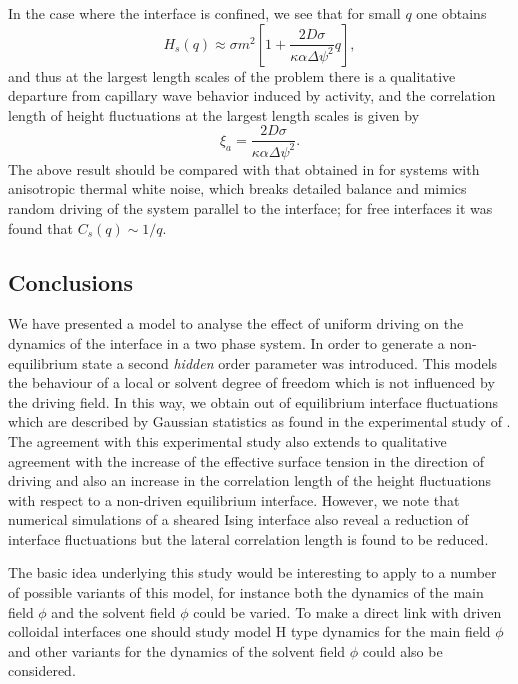 In the case where the interface is confined, we see that for small $q$ one obtains
\begin{equation}
    H_s(q) \approx \sigma m^2 \left[ 1+ \frac{2D\sigma }{\kappa\alpha \Delta\psi^2}q\right],
\end{equation}
and thus at the largest length scales of the problem there is a qualitative departure from capillary wave behavior induced by activity, and the correlation length of height fluctuations at the largest length scales is given by
\begin{equation}
    \xi_a = \frac{2D\sigma }{\kappa\alpha \Delta\psi^2}.
\end{equation}
The above result should be compared with that obtained in \cite{zia_interfacial_1991} for 
systems with anisotropic thermal white noise, which breaks detailed balance and mimics random driving of the system parallel to the interface; for free interfaces it was found that $C_s(q)\sim 1/q$.

    \subsection{Conclusions}
We have presented a model to analyse the effect of uniform driving on the dynamics of the interface in a two phase system. In order to generate a non-equilibrium state a second {\em hidden} order parameter was introduced. This models the behaviour of a local or solvent degree of freedom which is not influenced by the driving field. In this way, we obtain out of equilibrium interface fluctuations which are described by Gaussian statistics as found in the experimental study of \cite{derks_suppression_2006}. The agreement with this experimental study also extends to qualitative agreement with the increase of the effective surface tension in the direction of driving and also an increase in the correlation length of the height fluctuations with respect to a non-driven equilibrium interface. However, we  note that numerical simulations of a sheared Ising interface \cite{smith_interfaces_2008-1,smith_lateral_2010} also reveal a reduction of interface fluctuations but the lateral correlation length is found to be reduced.

The basic idea underlying this study would be interesting to apply to a number of possible variants of this model, for instance both the dynamics
of the main field $\phi$ and the solvent field $\phi$ could be varied. To make a direct link with driven colloidal interfaces one should study model H type dynamics for the main field $\phi$ and other variants for the dynamics of the 
solvent field $\phi$ could also be considered. 

